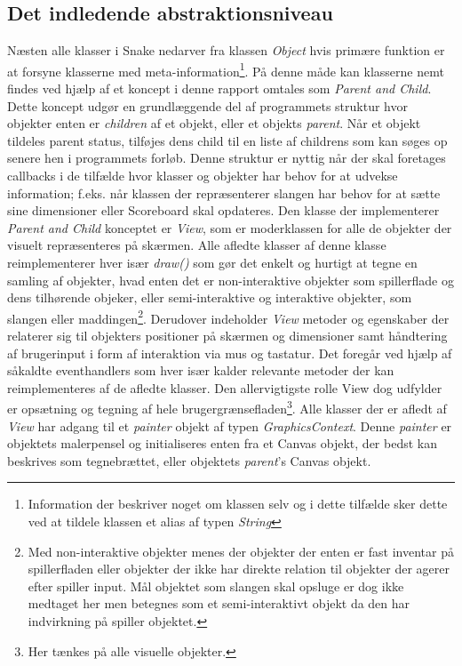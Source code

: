 \documentclass[]{article}
\begin{document}
\subsection{Det indledende abstraktionsniveau}
Næsten alle klasser i Snake nedarver fra klassen \textit{Object} hvis primære funktion er at forsyne klasserne med meta-information\footnote{Information der beskriver noget om klassen selv og i dette tilfælde sker dette ved at tildele klassen et alias af typen \textit{String}}. På denne måde kan klasserne nemt findes ved hjælp af et koncept i denne rapport omtales som \textit{Parent and Child}. Dette koncept udgør en grundlæggende del af programmets struktur hvor objekter enten er \textit{children} af et objekt, eller et objekts \textit{parent}. Når et objekt tildeles parent status, tilføjes dens child til en liste af childrens som kan søges op senere hen i programmets forløb. Denne struktur er nyttig når der skal foretages callbacks i de tilfælde hvor klasser og objekter har behov for at udvekse information; f.eks. når klassen der repræsenterer slangen har behov for at sætte sine dimensioner eller Scoreboard skal opdateres.
Den klasse der implementerer \textit{Parent and Child} konceptet er \textit{View}, som er moderklassen for alle de objekter der visuelt repræsenteres på skærmen. Alle afledte klasser af denne klasse reimplementerer hver især \textit{draw()} som gør det enkelt og hurtigt at tegne en samling af objekter, hvad enten det er non-interaktive objekter som spillerflade og dens tilhørende objeker, eller semi-interaktive og interaktive objekter, som slangen eller maddingen\footnote{Med non-interaktive objekter menes der objekter der enten er fast inventar på spillerfladen eller objekter der ikke har direkte relation til objekter der agerer efter spiller input. Mål objektet som slangen skal opsluge er  dog ikke medtaget her men betegnes som et semi-interaktivt objekt da den har indvirkning på spiller objektet.}.  Derudover indeholder \textit{View} metoder og egenskaber der relaterer sig til objekters positioner på skærmen og dimensioner samt håndtering af brugerinput i form af interaktion via mus og tastatur. Det foregår ved hjælp af såkaldte eventhandlers som hver især kalder relevante metoder der kan reimplementeres af de afledte klasser. Den allervigtigste rolle View dog udfylder er opsætning og tegning af hele brugergrænsefladen\footnote{Her tænkes på alle visuelle objekter.}. Alle klasser der er afledt af \textit{View} har adgang til et \textit{painter} objekt af typen \textit{GraphicsContext}. Denne \textit{painter} er objektets malerpensel og initialiseres enten fra et Canvas objekt, der bedst kan beskrives som tegnebrættet, eller objektets \textit{parent}'s Canvas objekt.
\end{document}
